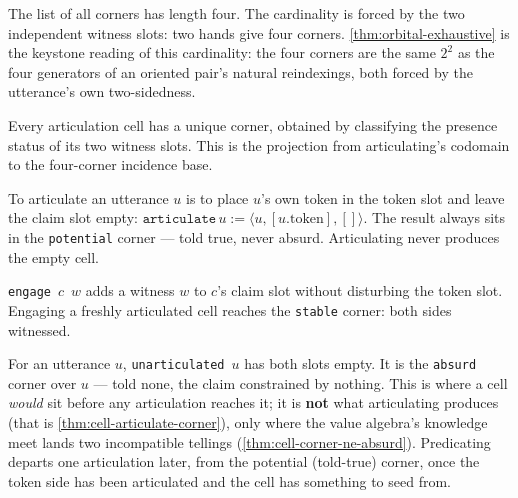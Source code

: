 \begin{theorem}\label{thm:corner-card}\leanok{}
The list of all corners has length four. The cardinality is forced by the
two independent witness slots: two hands give four corners. \cref{thm:orbital-exhaustive}
is the keystone reading of this cardinality: the four corners are the same
$2^2$ as the four generators of an oriented pair's natural reindexings, both
forced by the utterance's own two-sidedness.
\end{theorem}

\begin{proposition}\label{thm:articulation-cell-corner}\leanok{}
Every articulation cell has a unique corner, obtained by classifying the
presence status of its two witness slots. This is the projection from
articulating's codomain to the four-corner incidence base.
\end{proposition}

\begin{proposition}\label{thm:cell-articulate-corner}\leanok{}
To articulate an utterance $u$ is to place $u$'s own token in the token slot
and leave the claim slot empty: $\texttt{articulate}\,u := \langle u, [u.\mathrm{token}], []\rangle$.
The result always sits in the \texttt{potential} corner --- told true, never
absurd. Articulating never produces the empty cell.
\end{proposition}

\begin{proposition}\label{thm:cell-engage-corner}\leanok{}
\texttt{engage}~$c$~$w$ adds a witness $w$ to $c$'s claim slot without
disturbing the token slot. Engaging a freshly articulated cell reaches the
\texttt{stable} corner: both sides witnessed.
\end{proposition}

\begin{proposition}\label{thm:articulation-cell-initial}\leanok{}
For an utterance $u$, \texttt{unarticulated}~$u$ has both slots empty. It is
the \texttt{absurd} corner over $u$ --- told none, the claim constrained by
nothing. This is where a cell \emph{would} sit before any articulation
reaches it; it is \textbf{not} what articulating produces (that is
\cref{thm:cell-articulate-corner}), only where the value algebra's knowledge
meet lands two incompatible tellings (\cref{thm:cell-corner-ne-absurd}).
Predicating departs one articulation later, from the potential (told-true)
corner, once the token side has been articulated and the
cell has something to seed from.
\end{proposition}

